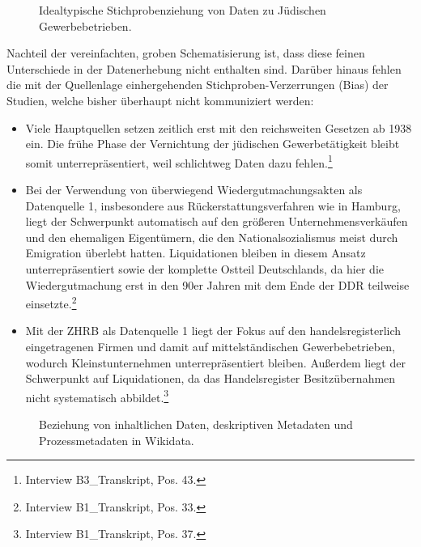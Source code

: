 \begin{figure}[h]
    \centering
    \caption{Idealtypische Stichprobenziehung von Daten zu Jüdischen Gewerbebetrieben.}
    \label{fig:flowchart}
\end{figure}

Nachteil der vereinfachten, groben Schematisierung ist, dass diese feinen Unterschiede in der Datenerhebung nicht enthalten sind. Darüber hinaus fehlen die mit der Quellenlage einhergehenden Stichproben-Verzerrungen (Bias) der Studien, welche bisher überhaupt nicht kommuniziert werden:

\begin{itemize}
    \item Viele Hauptquellen setzen zeitlich erst mit den reichsweiten Gesetzen ab 1938 ein. Die frühe Phase der Vernichtung der jüdischen Gewerbetätigkeit bleibt somit unterrepräsentiert, weil schlichtweg Daten dazu fehlen.\footnote{Interview B3\_Transkript, Pos. 43.}
    \item Bei der Verwendung von überwiegend Wiedergutmachungsakten als Datenquelle 1, insbesondere aus Rückerstattungsverfahren wie in Hamburg, liegt der Schwerpunkt automatisch auf den größeren Unternehmensverkäufen und den ehemaligen Eigentümern, die den Nationalsozialismus meist durch Emigration überlebt hatten. Liquidationen bleiben in diesem Ansatz unterrepräsentiert sowie der komplette Ostteil Deutschlands, da hier die Wiedergutmachung erst in den 90er Jahren mit dem Ende der DDR teilweise einsetzte.\footnote{Interview B1\_Transkript, Pos. 33.}
    \item Mit der ZHRB als Datenquelle 1 liegt der Fokus auf den handelsregisterlich eingetragenen Firmen und damit auf mittelständischen Gewerbebetrieben, wodurch Kleinstunternehmen unterrepräsentiert bleiben. Außerdem liegt der Schwerpunkt auf Liquidationen, da das Handelsregister Besitzübernahmen nicht systematisch abbildet.\footnote{Interview B1\_Transkript, Pos. 37.}
\end{itemize}

\begin{figure}[h]
    \centering
    \caption{Beziehung von inhaltlichen Daten, deskriptiven Metadaten und Prozessmetadaten in Wikidata.}
    \label{fig:datametadata}
\end{figure}

